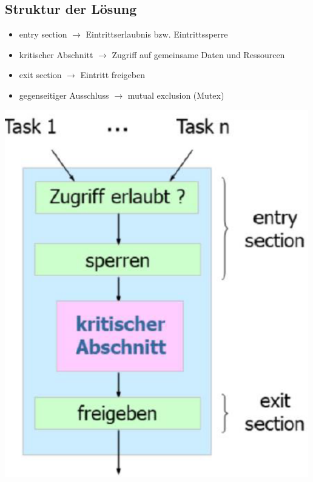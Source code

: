 \documentclass{report}
\newenvironment{Figure}
	{\par\medskip\noindent\minipage{\linewidth}}
	{\endminipage\par\medskip}
\theoremstyle{definition}
\theoremstyle{example}
\begin{document}
	\subsection{Struktur der Lösung}
\begin{itemize}
	\item entry section $\rightarrow$ Eintrittserlaubnis bzw. Eintrittssperre
	\item kritischer Abschnitt $\rightarrow$ Zugriff auf gemeinsame Daten und Ressourcen
	\item exit section $\rightarrow$ Eintritt freigeben
	\item gegenseitiger Ausschluss $\rightarrow$ mutual exclusion (Mutex)
\end{itemize}
\begin{Figure}
\centering
\includegraphics[width=500px]{img/kritischerAbschnittLsg.png}
	\label{fig:Struktur der Lösung eines kritischen Abschnittes}
\end{Figure}
\end{document}

